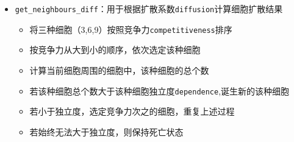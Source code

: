 \documentclass[11pt]{article}
\providecommand{\tightlist}{%
      \setlength{\itemsep}{0pt}\setlength{\parskip}{0pt}}
\begin{document}
    \begin{itemize}
\tightlist
\item
  \texttt{get\_neighbours\_diff}：用于根据扩散系数\texttt{diffusion}计算细胞扩散结果

  \begin{itemize}
  \tightlist
  \item
    将三种细胞（3,6,9）按照竞争力\texttt{competitiveness}排序
  \item
    按竞争力从大到小的顺序，依次选定该种细胞
  \item
    计算当前细胞周围的细胞中，该种细胞的总个数
  \item
    若该种细胞总个数大于该种细胞独立度\texttt{dependence},诞生新的该种细胞
  \item
    若小于独立度，选定竞争力次之的细胞，重复上述过程
  \item
    若始终无法大于独立度，则保持死亡状态
  \end{itemize}
\end{itemize}
\end{document}
